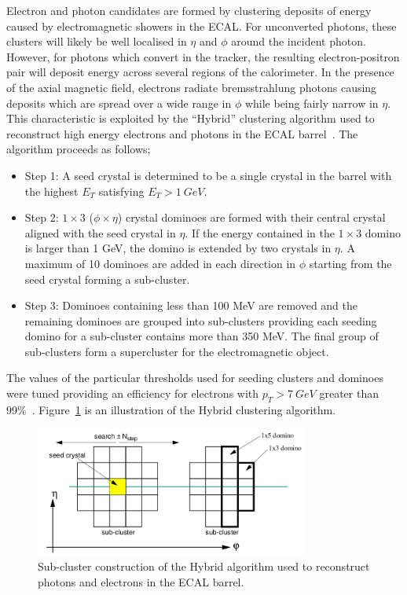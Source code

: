 Electron and photon candidates are formed by clustering deposits of 
energy caused by electromagnetic showers in the ECAL. For unconverted 
photons, these clusters will likely be well localised in $\eta$ and $\phi$
around the incident photon. However, for photons which convert in the tracker,
the resulting electron-positron pair will deposit energy across several regions
of the calorimeter. In the presence of the axial magnetic field, 
electrons radiate bremsstrahlung photons causing deposits which are 
spread over a wide range in $\phi$ while being fairly narrow in $\eta$.
This characteristic is exploited by the ``Hybrid'' clustering algorithm 
used to reconstruct high energy electrons and photons in
the ECAL barrel~\cite{cseez}. The algorithm proceeds as follows;
\begin{itemize}
 \item Step 1: A seed crystal is determined to be a single crystal in the barrel with the highest
 $E_{T}$ satisfying $E_{T}>1~GeV$.
 \item Step 2: $1\times3$ ($\phi\times\eta$) crystal dominoes are formed with their central crystal 
 aligned with the seed crystal in $\eta$. If the energy contained in the $1\times3$ domino is 
 larger than 1 GeV, the domino is extended by two crystals in $\eta$. A maximum of 10 dominoes are 
 added in each direction in $\phi$ starting from the seed crystal forming a sub-cluster.
 \item Step 3: Dominoes containing less than 100 MeV are removed and the remaining dominoes are 
 grouped into sub-clusters providing each seeding domino for a sub-cluster contains more than 350 MeV. 
 The final group of sub-clusters form a supercluster for the electromagnetic object.
\end{itemize}
The values of the particular thresholds used for seeding clusters and dominoes were tuned providing
an efficiency for electrons with $p_{T}>7~GeV$ greater than 99\%~\cite{dfutyan}.
Figure~\ref{fig:hybridclustering} is an illustration of the Hybrid clustering algorithm.

\begin{figure}
\begin{center}
	\includegraphics[width=0.8\textwidth]{detector/ecal/clustering.png}
	\caption{Sub-cluster construction of the Hybrid algorithm used to reconstruct photons and 
	electrons in the ECAL barrel.}
	\label{fig:hybridclustering}
\end{center}
\end{figure}

